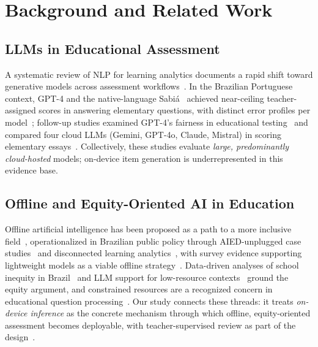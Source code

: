 \documentclass[fleqn,10pt]{JLA_article}
\begin{document}
\section{Background and Related Work}
\subsection{LLMs in Educational Assessment}
A systematic review of NLP for learning analytics documents a rapid shift toward generative models across assessment workflows~\autocite{mello2024wordsofwisdom}. In the Brazilian Portuguese context, GPT-4 and the native-language Sabi\'a~\autocite{pires2023sabia} achieved near-ceiling teacher-assigned scores in answering elementary questions, with distinct error profiles per model~\autocite{rodrigues2025llms}; follow-up studies examined GPT-4's fairness in educational testing~\autocite{rodrigues2025gpt4fair} and compared four cloud LLMs (Gemini, GPT-4o, Claude, Mistral) in scoring elementary essays~\autocite{lobo2025scoring}. Collectively, these studies evaluate \emph{large, predominantly cloud-hosted} models; on-device item generation is underrepresented in this evidence base.

\subsection{Offline and Equity-Oriented AI in Education}
Offline artificial intelligence has been proposed as a path to a more inclusive field~\autocite{mello2023offline}, operationalized in Brazilian public policy through AIED-unplugged case studies~\autocite{portela2023aied,portela2024unplugged} and disconnected learning analytics~\autocite{freitas2022learning}, with survey evidence supporting lightweight models as a viable offline strategy~\autocite{barros2025resourceconstrained}. Data-driven analyses of school inequity in Brazil~\autocite{portela2024equity} and LLM support for low-resource contexts~\autocite{mello2025equitable} ground the equity argument, and constrained resources are a recognized concern in educational question processing~\autocite{rodrigues2023question}. Our study connects these threads: it treats \emph{on-device inference} as the concrete mechanism through which offline, equity-oriented assessment becomes deployable, with teacher-supervised review as part of the design~\autocite{guerino2025mathaide,rosa2026automated}.
\end{document}
